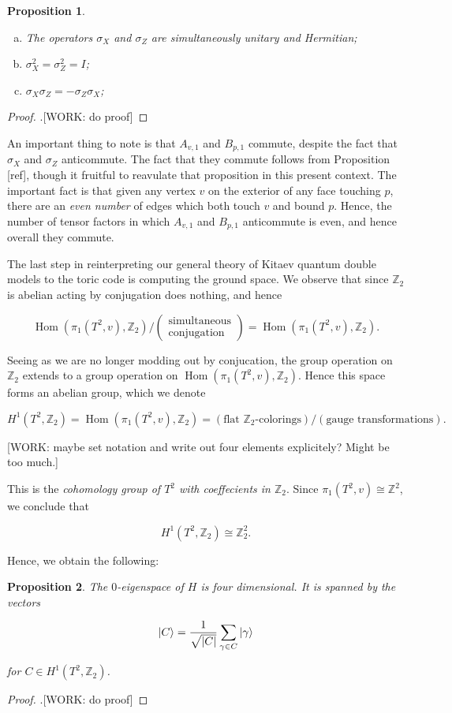 \documentclass{article}
\newtheorem{proposition}{Proposition}[section]
\theoremstyle{definition}
\DeclareMathOperator{\Hom}{Hom}
\newcommand{\ZZ}{\mathbb{Z}}
\newcommand{\0}{\left|0\right>}
\newcommand{\1}{\left|1\right>}
\numberwithin{figure}{section}
\begin{document}
\begin{proposition}$\,$
\begin{enumerate}[(a)]
\item The operators $\sigma_X$ and $\sigma_Z$ are simultaneously unitary and Hermitian;
\item $\sigma_X^2=\sigma_Z^2=I$;
\item $\sigma_X \sigma_Z = - \sigma_Z \sigma_X$;
\end{enumerate}
\end{proposition}
\begin{proof}.[WORK: do proof]
\end{proof}

An important thing to note is that $A_{v,1}$ and $B_{p,1}$ commute, despite the fact that $\sigma_X$ and $\sigma_Z$ anticommute. The fact that they commute follows from Proposition [ref], though it fruitful to reavulate that proposition in this present context. The important fact is that given any vertex $v$ on the exterior of any face touching $p$,  there are an \textit{even number} of edges which both touch $v$ and bound $p$. Hence, the number of tensor factors in which $A_{v,1}$ and $B_{p,1}$ anticommute is even, and hence overall they commute.

The last step in reinterpreting our general theory of Kitaev quantum double models to the toric code is computing the ground space. We observe that since $\ZZ_2$ is abelian acting by conjugation does nothing, and hence

$$\Hom(\pi_1(T^2,v), \ZZ_2)/\left(\substack{\text{simultaneous} \\ \text{conjugation}}\right)=\Hom(\pi_1(T^2,v), \ZZ_2).$$

Seeing as we are no longer modding out by conjucation, the group operation on $\ZZ_2$ extends to a group operation on $\Hom(\pi_1(T^2,v), \ZZ_2)$. Hence this space forms an abelian group, which we denote

$$H^1(T^2,\ZZ_2)=\Hom(\pi_1(T^2,v), \ZZ_2)=(\text{flat $\ZZ_2$-colorings})/(\text{gauge transformations}).$$

[WORK: maybe set notation and write out four elements explicitely? Might be too much.]

This is the \textit{cohomology group of $T^2$ with coeffecients in $\ZZ_2$}. Since $\pi_1(T^2,v)\cong \ZZ^2$, we conclude that

$$H^1(T^2,\ZZ_2)\cong \ZZ_2^2.$$

Hence, we obtain the following:

\begin{proposition} The $0$-eigenspace of $H$ is four dimensional. It is spanned by the vectors

$$\ket{C}=\frac{1}{\sqrt{|C|}}\sum_{\gamma\in C}\ket{\gamma}$$

for $C\in H^1(T^2,\ZZ_2)$.
\end{proposition}
\begin{proof}.[WORK: do proof]
\end{proof}
\end{document}
